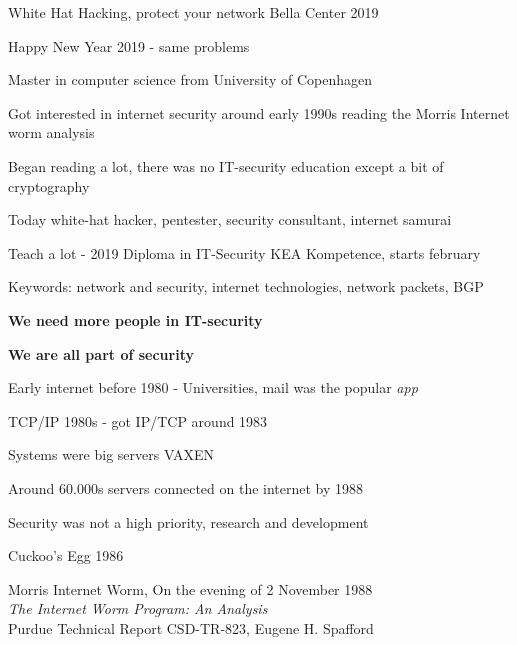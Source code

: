 \documentclass[Screen16to9,17pt,footrule]{foils}
\begin{document}
\mytitlepage
{White Hat Hacking, protect your network}
{Bella Center 2019}

\centerline{Happy New Year 2019 - same problems}



\begin{list2}
\item Master in computer science from University of Copenhagen
\item Got interested in internet security around early 1990s reading the Morris Internet worm analysis
\item Began reading a lot, there was no IT-security education except a bit of cryptography
\item Today white-hat hacker, pentester, security consultant, internet samurai
\item Teach a lot - 2019 Diploma in IT-Security KEA Kompetence, starts february
\item Keywords: network and security, internet technologies, network packets, BGP
\item {\bf We need more people in IT-security}
\end{list2}

\vskip 5mm
\centerline{\bf\Large We are all part of security}


\begin{list1}
\item Early internet before 1980 - Universities, mail was the popular \emph{app}
\item TCP/IP 1980s - got IP/TCP around 1983
\item Systems were big servers VAXEN
\item Around 60.000s servers connected on the internet by 1988
\item Security was not a high priority, research and development
\begin{list2}
\item Cuckoo's Egg 1986
\item Morris Internet Worm, On the evening of 2 November 1988\\
\emph{The Internet Worm Program: An Analysis}\\
Purdue Technical Report CSD-TR-823, Eugene H. Spafford
\end{list2}
\end{list1}


\end{document}
